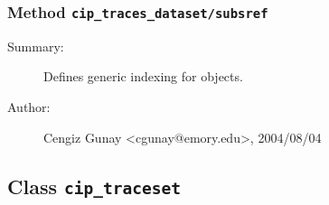 \subsubsection[Method \texttt{subsref}]{Method \texttt{cip\_traces\_dataset/subsref}}%
%
\label{ref_cip_traces_dataset__subsref}%
\hypertarget{ref_cip_traces_dataset__subsref}{}%
\begin{description}
\item[Summary:]Defines generic indexing for objects.
%
%
%
%
%
%
%
\item[Author:]%
Cengiz Gunay <cgunay@emory.edu>, 2004/08/04
%
\end{description}
\methodline%
\subsection{Class \texttt{cip\_traceset}}%
%
\label{ref_cip_traceset}%
\hypertarget{ref_cip_traceset}{}%

